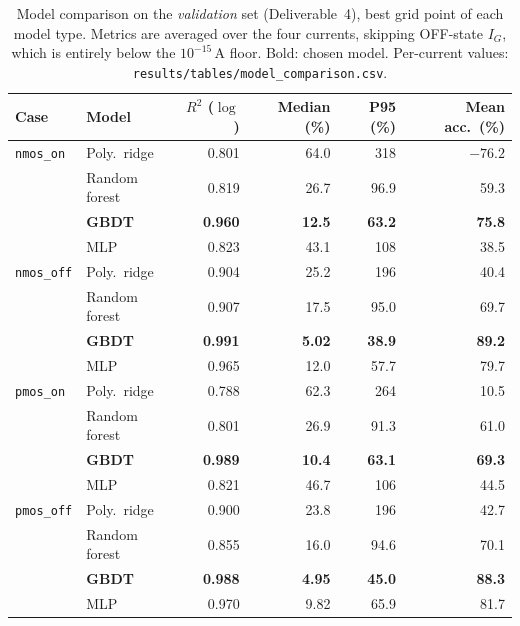 \begin{table}[h]
\centering\small
\begin{tabular}{@{}llrrrr@{}}
\toprule
Case & Model & $R^2$ ($\log$) & Median (\%) & P95 (\%) & Mean acc.\ (\%) \\
\midrule
\texttt{nmos\_on}  & Poly.\ ridge   & 0.801 & 64.0 & 318  & $-76.2$ \\
                   & Random forest  & 0.819 & 26.7 & 96.9 & 59.3 \\
                   & \textbf{GBDT}  & \textbf{0.960} & \textbf{12.5} & \textbf{63.2} & \textbf{75.8} \\
                   & MLP            & 0.823 & 43.1 & 108  & 38.5 \\
\midrule
\texttt{nmos\_off} & Poly.\ ridge   & 0.904 & 25.2 & 196  & 40.4 \\
                   & Random forest  & 0.907 & 17.5 & 95.0 & 69.7 \\
                   & \textbf{GBDT}  & \textbf{0.991} & \textbf{5.02} & \textbf{38.9} & \textbf{89.2} \\
                   & MLP            & 0.965 & 12.0 & 57.7 & 79.7 \\
\midrule
\texttt{pmos\_on}  & Poly.\ ridge   & 0.788 & 62.3 & 264  & 10.5 \\
                   & Random forest  & 0.801 & 26.9 & 91.3 & 61.0 \\
                   & \textbf{GBDT}  & \textbf{0.989} & \textbf{10.4} & \textbf{63.1} & \textbf{69.3} \\
                   & MLP            & 0.821 & 46.7 & 106  & 44.5 \\
\midrule
\texttt{pmos\_off} & Poly.\ ridge   & 0.900 & 23.8 & 196  & 42.7 \\
                   & Random forest  & 0.855 & 16.0 & 94.6 & 70.1 \\
                   & \textbf{GBDT}  & \textbf{0.988} & \textbf{4.95} & \textbf{45.0} & \textbf{88.3} \\
                   & MLP            & 0.970 & 9.82 & 65.9 & 81.7 \\
\bottomrule
\end{tabular}
\caption{Model comparison on the \emph{validation} set (Deliverable~4), best grid point of each
model type. Metrics are averaged over the four currents, skipping OFF-state $I_G$, which is
entirely below the $10^{-15}$\,A floor. Bold: chosen model. Per-current values:
\texttt{results/tables/model\_comparison.csv}.}
\label{tab:comparison}
\end{table}


